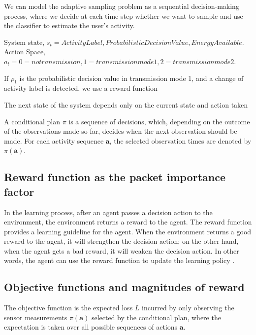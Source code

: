 \documentclass[letterpaper, 10pt, conference]{IEEEtran} %
\begin{document}
We can model the adaptive sampling problem as a sequential decision-making process, where we decide at each time step whether we want to sample and use the classifier to estimate the user’s activity.

System state, $s_{t}={Activity Label, Probabilistic Decision Value, Energy Available}$.
Action Space, $a_{t}={0=no transmission, 1= transmission mode 1, 2= transmission mode 2}$.

If $\rho_1$ is the probabilistic decision value in transmission mode 1, and a change of activity label is detected, we use a reward function

The next state of the system depends only on the current state and action taken

A conditional plan $\pi$ is a sequence of decisions, which, depending on the outcome of the observations made so far, decides when the next observation should be made.  For each activity
sequence $\boldsymbol{a}$, the selected observation times are denoted
by $\pi(\boldsymbol{a})$.

\subsection{Reward function as the packet importance factor}
  In the learning process, after an agent passes a decision action to the environment, the environment returns a reward to the agent. The reward function provides a learning guideline for the agent. When the environment returns a good reward to the agent, it will strengthen the decision action; on the other hand, when the agent gets a bad reward, it will weaken the decision action. In other words, the agent can use the reward function to update the learning policy \cite{Dezza2017nature}.
  
  
  \subsection{Objective functions and magnitudes of reward}
   \begin{figure}[H]
    \centering
    \label{fig:reward}
  \end{figure}
The objective function is the expected
loss $L$ incurred by only observing the sensor measurements $\pi(\boldsymbol{a})$ selected by the conditional plan, where the expectation
is taken over all possible sequences of actions $\boldsymbol{a}$.

\end{document}
